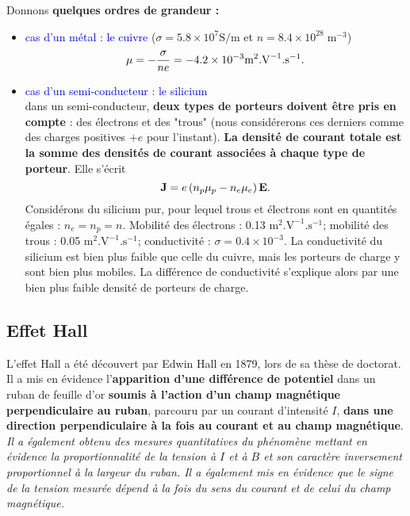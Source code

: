 \documentclass[11pt,a4paper]{report}
\begin{document}
Donnons \textbf{quelques ordres de grandeur :}
\begin{itemize}
	\item \textcolor{blue}{cas d'un métal : le cuivre} ($\sigma = 5.8\times 10^7 \text{S}/\text{m}$ et $n = 8.4 \times 10^{28} \;\text{m}^{-3}$)\\
	\begin{equation}
		\mu = -\frac{\sigma}{n e} = -4.2\times10^{-3} \text{m}^2.\text{V}^{-1}.\text{s}^{-1}.\\
	\end{equation}
	
	\item \textcolor{blue}{cas d'un semi-conducteur : le silicium}\\
	dans un semi-conducteur, \textbf{deux types de porteurs doivent être pris en compte} : des électrons et des "trous" (nous considérerons ces derniers comme des charges positives $+e$ pour l'instant). \textbf{La densité de courant totale est la somme des densités de courant associées à chaque type de porteur}. Elle s'écrit
	\begin{equation}
		\bold{J} = e\left(n_p \mu_p - n_e \mu_e \right)\bold{E}.
	\end{equation}
	Considérons du silicium pur, pour lequel trous et électrons sont en quantités égales : $n_e = n_p = n$. Mobilité des électrons : 0.13 $\text{m}^2.\text{V}^{-1}.\text{s}^{-1}$; 
	mobilité des trous : 0.05 $\text{m}^2.\text{V}^{-1}.\text{s}^{-1}$; conductivité : $\sigma = 0.4\times 10^{-3}$. La conductivité du silicium est bien plus faible que celle du cuivre, 			mais les porteurs de charge y sont bien plus mobiles. La différence de conductivité s'explique alors par une bien plus faible densité de porteurs de charge.\\
\end{itemize}
	
\subsection{Effet Hall}

L'effet Hall a été découvert par Edwin Hall en 1879, lors de sa thèse de doctorat. Il a mis en évidence l'\textbf{apparition d'une différence de potentiel} dans un ruban de feuille d'or \textbf{soumis à l'action d'un champ magnétique perpendiculaire au ruban}, parcouru par un courant d'intensité $I$, \textbf{dans une direction perpendiculaire à la fois au courant et au champ magnétique}. \textit{Il a également obtenu des mesures quantitatives du phénomène mettant en évidence la proportionnalité de la tension à $I$ et à $B$ et son caractère inversement proportionnel à la largeur du ruban. Il a également mis en évidence que le signe de la tension mesurée dépend à la fois du sens du courant et de celui du champ magnétique.}
\end{document}
